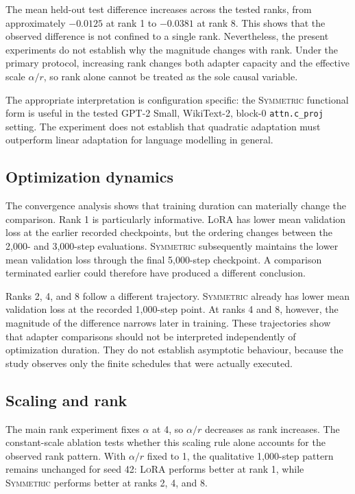 \documentclass[11pt]{article}
\newcommand{\sym}{\textsc{Symmetric}}\newcommand{\lora}{\textsc{LoRA}}
\begin{document}
The mean held-out test difference increases across the tested ranks, from approximately $-0.0125$ at rank 1 to $-0.0381$ at rank 8. This shows that the observed difference is not confined to a single rank. Nevertheless, the present experiments do not establish why the magnitude changes with rank. Under the primary protocol, increasing rank changes both adapter capacity and the effective scale $\alpha/r$, so rank alone cannot be treated as the sole causal variable.

The appropriate interpretation is configuration specific: the \sym{} functional form is useful in the tested GPT-2 Small, WikiText-2, block-0 \texttt{attn.c\_proj} setting. The experiment does not establish that quadratic adaptation must outperform linear adaptation for language modelling in general.

\subsection{Optimization dynamics}
The convergence analysis shows that training duration can materially change the comparison. Rank 1 is particularly informative. \lora{} has lower mean validation loss at the earlier recorded checkpoints, but the ordering changes between the 2,000- and 3,000-step evaluations. \sym{} subsequently maintains the lower mean validation loss through the final 5,000-step checkpoint. A comparison terminated earlier could therefore have produced a different conclusion.

Ranks 2, 4, and 8 follow a different trajectory. \sym{} already has lower mean validation loss at the recorded 1,000-step point. At ranks 4 and 8, however, the magnitude of the difference narrows later in training. These trajectories show that adapter comparisons should not be interpreted independently of optimization duration. They do not establish asymptotic behaviour, because the study observes only the finite schedules that were actually executed.

\subsection{Scaling and rank}
The main rank experiment fixes $\alpha$ at 4, so $\alpha/r$ decreases as rank increases. The constant-scale ablation tests whether this scaling rule alone accounts for the observed rank pattern. With $\alpha/r$ fixed to 1, the qualitative 1,000-step pattern remains unchanged for seed 42: \lora{} performs better at rank 1, while \sym{} performs better at ranks 2, 4, and 8.
\end{document}
